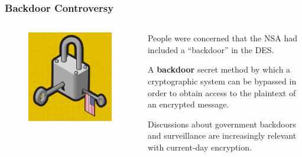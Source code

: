 \documentclass{beamer}
\newcommand{\<}{\langle}
\renewcommand{\>}{\rangle}
\begin{document}
\begin{frame}
\frametitle{Backdoor Controversy}

\begin{columns}
\begin{column}{.5\textwidth}
\begin{figure}
\includegraphics[scale=.2]{IMG/backdoor}
\caption{}
\end{figure}
\end{column}

\begin{column}{.5\textwidth}\small
People were concerned that the NSA had included a ``backdoor'' in the DES.
\newline

A \textbf{backdoor} secret method by which a cryptographic system can be bypassed in order to obtain access to the plaintext of an encrypted message. \newline

Discussions about government backdoors and surveillance are increasingly relevant with current-day encryption. 
\end{column}
\end{columns}
\end{frame}
\end{document}
